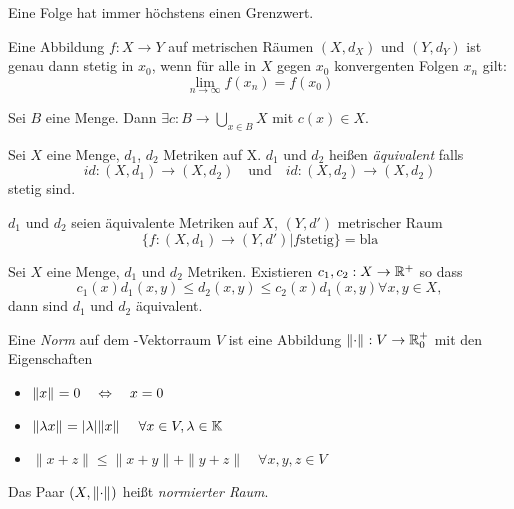 \begin{stz}
    Eine Folge hat immer höchstens einen Grenzwert.
\end{stz}

\begin{stz}
    Eine Abbildung $f: X \to Y$ auf metrischen Räumen $(X, d_X)$ und $(Y, d_Y)$ ist
    genau dann stetig in $x_0$, wenn für alle in $X$ gegen $x_0$ konvergenten Folgen
    $x_n$ gilt: \[\lim_{n\to \infty} f(x_n) = f(x_0)\]
\end{stz}

\begin{axm}[Auswahlaxiom]
    Sei $B$ eine Menge. Dann $\exists c: B \to \bigcup_{x\in B} X$ mit $c(x)\in X$.   
\end{axm}

\begin{dfn}
    Sei $X$ eine Menge, $d_1$, $d_2$ Metriken auf X. $d_1$ und $d_2$ heißen
    \emph{äquivalent} falls
    \[id: (X, d_1) \to (X, d_2) \quad \mathrm{und}\quad id: (X, d_2) \to (X, d_2)\]
    stetig sind.

\begin{bem}
    $d_1$ und $d_2$ seien äquivalente Metriken auf $X$, $(Y, d')$ metrischer Raum
    \[\{f:(X, d_1) \to (Y, d') | f \mathrm{stetig} \} = \mathrm{bla}\]
\end{bem}
\end{dfn}

\begin{stz}
    Sei $X$ eine Menge, $d_1$ und $d_2$ Metriken. Existieren $c_1, c_2: X\to
    \mathbb{R}^+$ so dass
    \[c_1(x)d_1(x, y) \leq d_2(x,y) \leq c_2(x)d_1(x,y) \forall x,y \in X,\]
    dann sind $d_1$ und $d_2$ äquivalent.
\end{stz}

\begin{dfn}
    Eine \emph{Norm} auf dem -Vektorraum $V$ ist eine Abbildung
    $\norm{\cdot}: V \to \R^+_0$ mit den Eigenschaften
    \begin{itemize}
        \item $\norm{x} = 0 \quad \Equiv \quad x = 0$
        \item $\norm{\lambda x} = |\lambda| \norm{x} \
                    \quad \forall x \in V, \lambda \in \menge{K}$
        \item $\|x + z\| \leq \|x + y\| + \|y + z\| \quad \forall x,y,z \in V$
    \end{itemize}
    Das Paar $(X, \norm{\cdot})$ heißt \emph{normierter Raum}.
\end{dfn}


